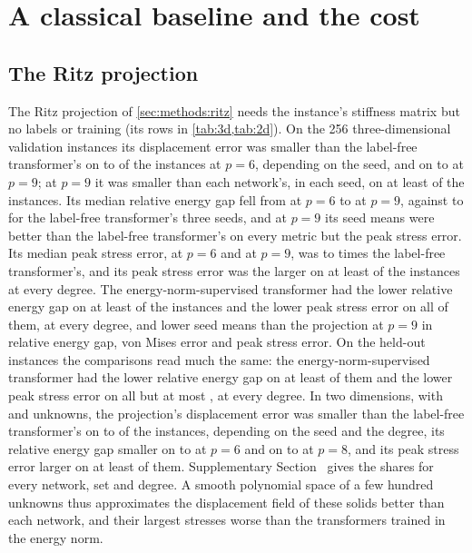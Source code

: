 \section{A classical baseline and the cost}\label{sec:cost}

\subsection{The Ritz projection}\label{sec:cost:ritz}

The Ritz projection of \cref{sec:methods:ritz} needs the instance's stiffness matrix but no
labels or training (its rows in \cref{tab:3d,tab:2d}). On the 256 three-dimensional
validation instances its displacement error was smaller than the label-free transformer's on
\numRitzValFreeDispSixMin{} to \numRitzValFreeDispSixMax{} of the instances at $p=6$,
depending on the seed, and on \numRitzValFreeDispNineMin{} to \numRitzValFreeDispNineMax{}
at $p=9$; at $p=9$ it was smaller than each network's, in each seed, on at least
\numRitzValNineDispAll{} of the instances. Its median relative energy gap fell from
\numRitzValGapSix{} at $p=6$ to \numRitzValGapNine{} at $p=9$, against \numKdFreeMedMin{} to
\numKdFreeMedMax{} for the label-free transformer's three seeds, and at $p=9$ its seed means
were better than the label-free transformer's on every metric but the peak stress error. Its
median peak stress error, \numRitzValPeakSix{} at $p=6$ and \numRitzValPeakNine{} at $p=9$,
was \numRitzValPeakRatioMin{} to \numRitzValPeakRatioMax{} times the label-free
transformer's, and its peak stress error was the larger on at least \numRitzValFreePeakMin{}
of the instances at every degree. The energy-norm-supervised transformer had the lower
relative energy gap on at least \numRitzValKnormGapMin{} of the instances and the lower peak
stress error on all of them, at every degree, and lower seed means than the projection at
$p=9$ in relative energy gap, von Mises error and peak stress error. On the held-out
instances the comparisons read much the same: the energy-norm-supervised transformer had the
lower relative energy gap on at least \numRitzHoldKnormGapMin{} of them and the lower peak
stress error on all but at most \numRitzHoldKnormPeakMiss{}, at every degree. In two
dimensions, with \numRitzTwoKSix{} and \numRitzTwoKEight{} unknowns, the projection's
displacement error was smaller than the label-free transformer's on \numRitzTwoFreeDispMin{}
to \numRitzTwoFreeDispMax{} of the instances, depending on the seed and the degree, its
relative energy gap smaller on \numRitzTwoFreeGapSixMin{} to \numRitzTwoFreeGapSixMax{} at
$p=6$ and on \numRitzTwoFreeGapEightMin{} to \numRitzTwoFreeGapEightMax{} at $p=8$, and its
peak stress error larger on at least \numRitzTwoFreePeakMin{} of them. Supplementary
Section~\SuppRitz{} gives the shares for every network, set and degree. A smooth polynomial
space of a few hundred unknowns thus approximates the displacement field of these solids
better than each network, and their largest stresses worse than the transformers trained in
the energy norm.

